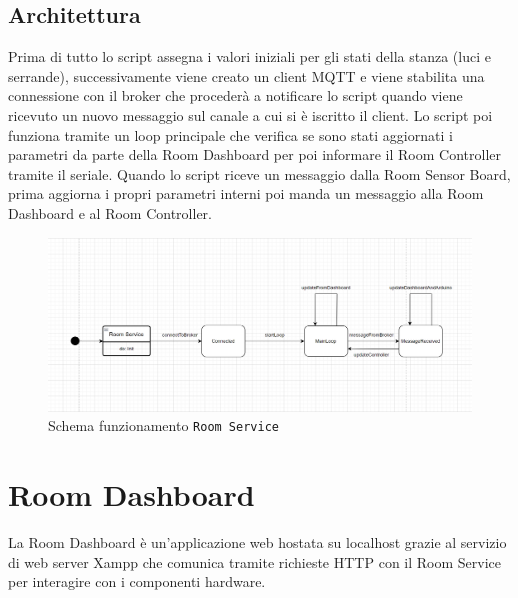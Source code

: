 \documentclass[12pt]{article}
\def\code#1{\texttt{#1}}
\begin{document}
\subsection{Architettura}
Prima di tutto lo script assegna i valori iniziali per gli stati della stanza (luci e serrande), successivamente viene creato un client MQTT e viene stabilita una connessione con il broker che procederà a notificare lo script quando viene ricevuto un nuovo messaggio sul canale a cui si è iscritto il client.\newline
Lo script poi funziona tramite un loop principale che verifica se sono stati aggiornati i parametri da parte della Room Dashboard per poi informare il Room Controller tramite il seriale. Quando lo script riceve un messaggio dalla Room Sensor Board, prima aggiorna i propri parametri interni poi manda un messaggio alla Room Dashboard e al Room Controller.\newline
\begin{figure}[H]
    \includegraphics[width=17cm]{room-service.png}
    \centering
    \caption{Schema funzionamento \code{Room Service}}
    \centering
\end{figure}


\newpage


\section{Room Dashboard}

La Room Dashboard è un'applicazione web hostata su localhost grazie al servizio di web server Xampp che comunica tramite richieste HTTP con il Room Service per interagire con i componenti hardware.
\end{document}
